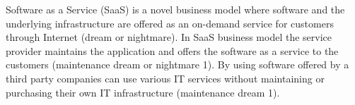 \documentclass[conference]{sasmoota2017}
\begin{document}
%
%
%
% 



Software as a Service (SaaS) is a novel business model where software and the underlying infrastructure are offered as an on-demand service for customers through Internet (dream or nightmare). In SaaS business model the service provider maintains the application and offers the software as a service to the customers (maintenance dream or nightmare 1). By using software offered by a third party companies can use various IT services without maintaining or purchasing their own IT infrastructure (maintenance dream 1). 
\end{document}
